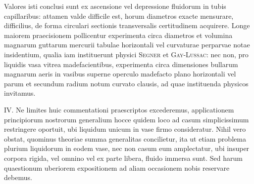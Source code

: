 Valores isti conclusi sunt ex ascensione vel depressione fluidorum in tubis capillaribus: attamen valde difficile est, horum diametros exacte mensurare, difficilius, de forma circulari sectionis transversalis certitudinem acquirere. Longe maiorem praecisionem pollicentur experimenta circa diametros et volumina magnarum guttarum mercurii tabulae horizontali vel curvaturae perparvae notae insidentium, qualia iam instituerunt physici \textsc{Segner} et \textsc{Gay-Lussac}: nec non, pro liquidis vasa vitrea madefacientibus, experimenta circa dimensiones bullarum magnarum aeris in vasibus superne operculo madefacto plano horizontali vel parum et secundum radium notum curvato clausis, ad quae instituenda physicos invitamus.

IV. Ne limites huic commentationi praescriptos excederemus, applicationem principiorum nostrorum generalium hocce quidem loco ad casum simplicissimum restringere oportuit, ubi liquidum unicum in vase firmo consideratur. Nihil vero obstat, quominus theoriae summa generalitas concilietur, ita ut etiam problema plurium liquidorum in eodem vase, nec non casum eum amplectatur, ubi insuper corpora rigida, vel omnino vel ex parte libera, fluido immersa sunt. Sed harum quaestionum uberiorem expositionem ad aliam occasionem nobis reservare debemus.
